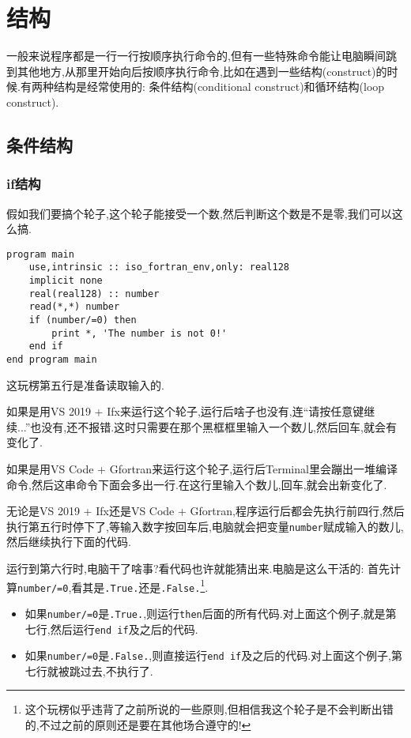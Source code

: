 \chapter{结构}\label{fortran_construct}

一般来说程序都是一行一行按顺序执行命令的,但有一些特殊命令能让电脑瞬间跳到其他地方,从那里开始向后按顺序执行命令,比如在遇到一些结构(construct)的时候.有两种结构是经常使用的: 条件结构(conditional construct)和循环结构(loop construct).

\section{条件结构}

\subsection{if结构}\label{if_construct}

假如我们要搞个轮子,这个轮子能接受一个数,然后判断这个数是不是零,我们可以这么搞.
\begin{lstlisting}
program main
    use,intrinsic :: iso_fortran_env,only: real128
    implicit none
    real(real128) :: number
    read(*,*) number
    if (number/=0) then
        print *, 'The number is not 0!'
    end if
end program main
\end{lstlisting}

这玩楞第五行是准备读取输入的.

如果是用VS 2019 + Ifx来运行这个轮子,运行后啥子也没有,连``请按任意键继续...''也没有,还不报错.这时只需要在那个黑框框里输入一个数儿,然后回车,就会有变化了.

如果是用VS Code + Gfortran来运行这个轮子,运行后Terminal里会蹦出一堆编译命令,然后这串命令下面会多出一行.在这行里输入个数儿,回车,就会出新变化了.

无论是VS 2019 + Ifx还是VS Code + Gfortran,程序运行后都会先执行前四行,然后执行第五行时停下了,等输入数字按回车后,电脑就会把变量\texttt{number}赋成输入的数儿,然后继续执行下面的代码.

运行到第六行时,电脑干了啥事?看代码也许就能猜出来.电脑是这么干活的: 首先计算\texttt{number/=0},看其是\texttt{.True.}还是\texttt{.False.}\footnote{
    这个玩楞似乎违背了之前所说的一些原则,但相信我这个轮子是不会判断出错的,不过之前的原则还是要在其他场合遵守的!
}.
\begin{itemize}
    \item 如果\texttt{number/=0}是\texttt{.True.},则运行\texttt{then}后面的所有代码.对上面这个例子,就是第七行,然后运行\texttt{end if}及之后的代码.
    \item 如果\texttt{number/=0}是\texttt{.False.},则直接运行\texttt{end if}及之后的代码.对上面这个例子,第七行就被跳过去,不执行了.
\end{itemize}

